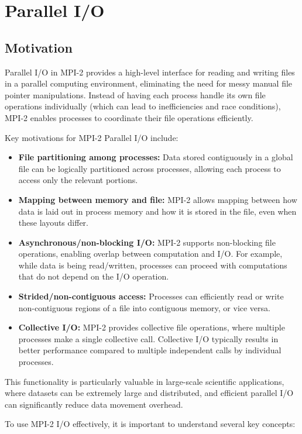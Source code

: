 \documentclass[12pt]{book}
\begin{document}
\section{Parallel I/O}
\subsection{Motivation}
Parallel I/O in MPI-2 provides a high-level interface for reading and writing files in a parallel computing environment, eliminating the need for messy manual file pointer manipulations. Instead of having each process handle its own file operations individually (which can lead to inefficiencies and race conditions), MPI-2 enables processes to coordinate their file operations efficiently.

Key motivations for MPI-2 Parallel I/O include:
\begin{itemize}
    \item \textbf{File partitioning among processes:} Data stored contiguously in a global file can be logically partitioned across processes, allowing each process to access only the relevant portions.
    \item \textbf{Mapping between memory and file:} MPI-2 allows mapping between how data is laid out in process memory and how it is stored in the file, even when these layouts differ.
    \item \textbf{Asynchronous/non-blocking I/O:} MPI-2 supports non-blocking file operations, enabling overlap between computation and I/O. For example, while data is being read/written, processes can proceed with computations that do not depend on the I/O operation.
    \item \textbf{Strided/non-contiguous access:} Processes can efficiently read or write non-contiguous regions of a file into contiguous memory, or vice versa.
    \item \textbf{Collective I/O:} MPI-2 provides collective file operations, where multiple processes make a single collective call. Collective I/O typically results in better performance compared to multiple independent calls by individual processes.
\end{itemize}

This functionality is particularly valuable in large-scale scientific applications, where datasets can be extremely large and distributed, and efficient parallel I/O can significantly reduce data movement overhead.

To use MPI-2 I/O effectively, it is important to understand several key concepts:
\end{document}
